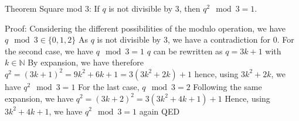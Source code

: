 Theorem Square mod 3:
If $q$ is not divisible by $3$, then $q^2 \mod 3 = 1$.


Proof:
Considering the different possibilities of the modulo operation, we have $q \mod 3 \in \{ 0, 1, 2 \}$
As $q$ is not divisible by $3$, we have a contradiction for $0$.
For the second case, we have $q \mod 3 = 1$
    $q$ can be rewritten as $q = 3k + 1$ with $k \in \mathbb{N}$
    By expansion, we have therefore $q^2 = (3k+1)^2 = 9k^2+6k+1 = 3(3k^2 + 2k) + 1$
    hence, using $3k^2 + 2k$, we have $q^2 \mod 3 = 1$
For the last case, $q \mod 3 = 2$
    Following the same expansion, we have $q^2 = (3k+2)^2 = 3(3k^2+4k+1) +1$
    Hence, using $3k^2 + 4k + 1$, we have $q^2 \mod 3 = 1$ again
QED